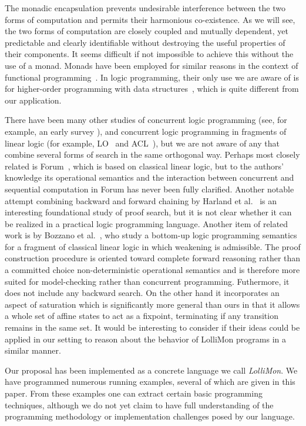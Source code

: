 \documentclass{sig-alt}
\begin{document}
The monadic encapsulation prevents undesirable interference between
the two forms of computation and permits their harmonious
co-existence.  As we will see, the two forms of computation are
closely coupled and mutually dependent, yet predictable and clear\-ly
identifiable without destroying the useful properties of their
components.  It seems difficult if not impossible to achieve this
without the use of a monad.  Monads have been employed for similar
reasons in the context of functional programming~\cite{Wadler92popl}.
In logic programming, their only use we are aware of is for
higher-order programming with data structures~\cite{Bekkers95ilps,McGrail97},
which is quite different from our application.

There have been many other studies of concurrent logic programming (see,
for example, an early survey \cite{Shapiro89}), and concurrent logic
programming in fragments of linear logic (for example, LO~\cite{Andreoli90oopsla} and
ACL~\cite{Kobayashi94tr}), but we are not aware of
any that combine several forms of search in the same orthogonal way.
Perhaps most closely related is Forum~\cite{Miller96tcs}, which is based on
classical linear logic, but to the authors' knowledge its operational
semantics and the interaction between concurrent and sequential
computation in Forum has never been fully clarified.  Another notable
attempt combining backward and forward chaining by Harland et
al.\ \cite{Harland00pstt} is an interesting foundational study of proof
search, but it is not clear whether it can be realized in a practical
logic programming language.
Another item of related work is by Bozzano et al.~\cite{Bozzano04tplp},
who study a bottom-up logic programming semantics for a fragment of
classical linear logic in which weakening is admissible.  The proof
construction procedure is oriented toward complete forward reasoning
rather than a committed choice non-deterministic operational semantics
and is therefore more suited for model-checking rather than concurrent
programming.  Futhermore, it does not include any backward search.  On
the other hand it incorporates an aspect of saturation which is
significantly more general than ours in that it allows a whole set of
affine states to act as a fixpoint, terminating if any transition
remains in the same set.  It would be interesting to consider if their
ideas could be applied in our setting to reason about the behavior of
LolliMon programs in a similar manner.

Our proposal has been implemented as a concrete language we call
\emph{LolliMon}.  We have programmed numerous running examples,
several of which are given in this paper.  From these examples one can
extract certain basic programming techniques, although we do not yet
claim to have full understanding of the programming methodology or
implementation challenges posed by our language.
\end{document}
